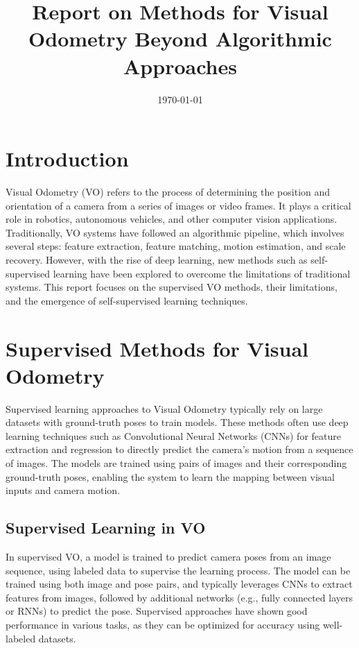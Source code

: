 \documentclass[12pt]{article}
\title{Report on Methods for Visual Odometry Beyond Algorithmic Approaches}
\author{}
\date{\today}
\begin{document}
\maketitle

\section{Introduction}
Visual Odometry (VO) refers to the process of determining the position and orientation of a camera from a series of images or video frames. It plays a critical role in robotics, autonomous vehicles, and other computer vision applications. Traditionally, VO systems have followed an algorithmic pipeline, which involves several steps: feature extraction, feature matching, motion estimation, and scale recovery. However, with the rise of deep learning, new methods such as self-supervised learning have been explored to overcome the limitations of traditional systems. This report focuses on the supervised VO methods, their limitations, and the emergence of self-supervised learning techniques.

\section{Supervised Methods for Visual Odometry}
Supervised learning approaches to Visual Odometry typically rely on large datasets with ground-truth poses to train models. These methods often use deep learning techniques such as Convolutional Neural Networks (CNNs) for feature extraction and regression to directly predict the camera's motion from a sequence of images. The models are trained using pairs of images and their corresponding ground-truth poses, enabling the system to learn the mapping between visual inputs and camera motion.

\subsection{Supervised Learning in VO}
In supervised VO, a model is trained to predict camera poses from an image sequence, using labeled data to supervise the learning process. The model can be trained using both image and pose pairs, and typically leverages CNNs to extract features from images, followed by additional networks (e.g., fully connected layers or RNNs) to predict the pose. Supervised approaches have shown good performance in various tasks, as they can be optimized for accuracy using well-labeled datasets.
\end{document}
